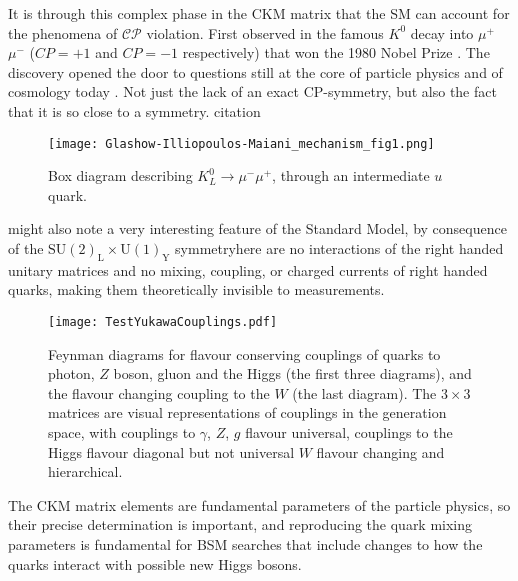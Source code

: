 It is through this complex phase in the CKM matrix that the SM can account for the phenomena of $\mathcal{CP}$ violation. First observed in the famous $K^0$ decay into $\mu^+$ $\mu^-$ ($CP=+1$ and $CP=-1$ respectively) that won the 1980 Nobel Prize . The discovery opened the door to questions still at the core of particle physics and of cosmology today . Not just the lack of an exact CP-symmetry, but also the fact that it is so close to a symmetry. {\color{blue} citation}

\begin{figure}[H]
	\centering
	\texttt{[image: Glashow-Illiopoulos-Maiani\_mechanism\_fig1.png]}
	\caption{Box diagram describing $K_L^0\rightarrow\mu^-\mu^+$, through an intermediate $u$ quark. }
	\label{fig:Kaon}
\end{figure}

%
 might also note a very interesting feature of the Standard Model, by consequence of the $\mathrm{SU(2)_L \times U(1)_Y }$ symmetryhere are no interactions of the right handed unitary matrices and  no mixing, coupling, or charged currents of right handed quarks, making them theoretically invisible to measurements. 
%
\begin{figure}[H]
	\centering
	\texttt{[image: TestYukawaCouplings.pdf]}
	\caption{ Feynman diagrams for flavour conserving couplings of quarks to photon, $Z$ boson, gluon and the Higgs (the first three diagrams), and the flavour changing coupling to the $W$ (the last diagram). The $3\times3$ matrices are visual representations of couplings in the generation space, with couplings to $\gamma$, $Z$, $g$  flavour universal,  couplings to the Higgs flavour  diagonal but not universal $W$  flavour changing and hierarchical.}
	\label{fig:QuarkCKM}
\end{figure}
%

%

The CKM matrix elements are fundamental parameters of the particle physics, so their precise determination is important, and reproducing the quark mixing parameters is fundamental for BSM searches that include changes to how the quarks interact with possible new Higgs bosons. 
